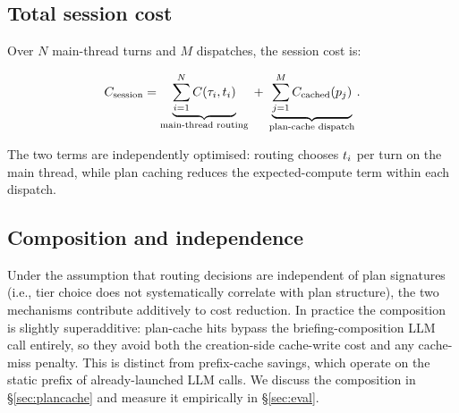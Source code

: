 \subsection{Total session cost}

Over \(N\) main-thread turns and \(M\) dispatches, the session cost is:

\begin{equation}
  C_{\text{session}} =
    \underbrace{\sum_{i=1}^{N} C(\tau_i, t_i)}_{\text{main-thread routing}} \;+\;
    \underbrace{\sum_{j=1}^{M} C_{\text{cached}}(p_j)}_{\text{plan-cache dispatch}}.
  \label{eq:session}
\end{equation}

The two terms are independently optimised: routing chooses
\(t_i\) per turn on the main thread, while plan caching reduces
the expected-compute term within each dispatch.

\subsection{Composition and independence}

Under the assumption that routing decisions are independent of plan
signatures (i.e., tier choice does not systematically correlate with
plan structure), the two mechanisms contribute additively to cost
reduction.  In practice the composition is slightly superadditive:
plan-cache hits bypass the briefing-composition LLM call entirely,
so they avoid both the creation-side cache-write cost and any
cache-miss penalty.  This is distinct from prefix-cache savings, which
operate on the static prefix of already-launched LLM calls.  We
discuss the composition in §\ref{sec:plancache} and measure it
empirically in §\ref{sec:eval}.
